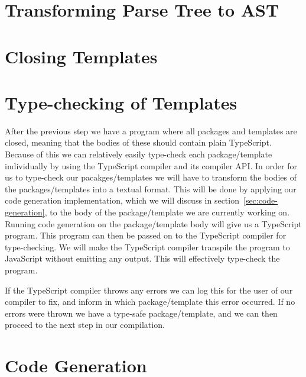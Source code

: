 \section{Transforming Parse Tree to AST}\label{sec:transforming-parse-tree-to-ast}


\section{Closing Templates}\label{sec:closing-templates}


\section{Type-checking of Templates}\label{sec:type-checking-of-templates}

After the previous step we have a program where all packages and templates are closed, meaning that the bodies of these should contain plain TypeScript.
Because of this we can relatively easily type-check each package/template individually by using the TypeScript compiler and its compiler API\@.
In order for us to type-check our pacakges/templates we will have to transform the bodies of the packages/templates into a textual format.
This will be done by applying our code generation implementation, which we will discuss in section~\vref{sec:code-generation}, to the body of the package/template we are currently working on.
Running code generation on the package/template body will give us a TypeScript program.
This program can then be passed on to the TypeScript compiler for type-checking.
We will make the TypeScript compiler transpile the program to JavaScript without emitting any output.
This will effectively type-check the program.

If the TypeScript compiler throws any errors we can log this for the user of our compiler to fix, and inform in which package/template this error occurred.
If no errors were thrown we have a type-safe package/template, and we can then proceed to the next step in our compilation.

\section{Code Generation}\label{sec:code-generation}

